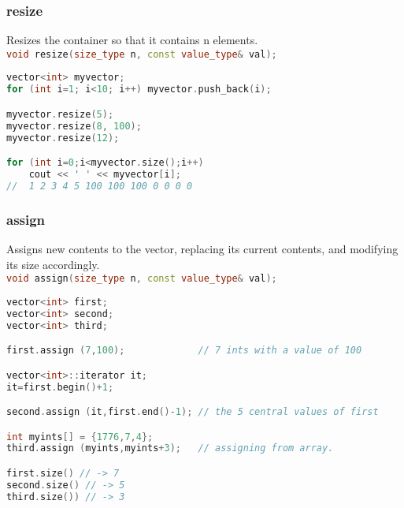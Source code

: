 \subsubsection{resize}
Resizes the container so that it contains n elements. \\
\lstinline[language=C++]{void resize(size_type n, const value_type& val);} \\
\begin{lstlisting}[language=C++]
vector<int> myvector;
for (int i=1; i<10; i++) myvector.push_back(i);

myvector.resize(5);
myvector.resize(8, 100);
myvector.resize(12);

for (int i=0;i<myvector.size();i++)
    cout << ' ' << myvector[i];
//  1 2 3 4 5 100 100 100 0 0 0 0
\end{lstlisting}

\subsubsection{assign}
Assigns new contents to the vector, replacing its current contents, and modifying its size accordingly. \\
\lstinline[language=C++]{void assign(size_type n, const value_type& val);} \\

\begin{lstlisting}[language=C++]
vector<int> first;
vector<int> second;
vector<int> third;

first.assign (7,100);             // 7 ints with a value of 100

vector<int>::iterator it;
it=first.begin()+1;

second.assign (it,first.end()-1); // the 5 central values of first

int myints[] = {1776,7,4};
third.assign (myints,myints+3);   // assigning from array.

first.size() // -> 7
second.size() // -> 5
third.size()) // -> 3

\end{lstlisting}

